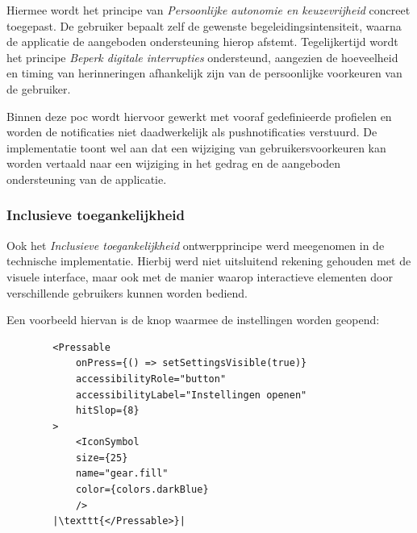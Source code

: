 \vspace{1em}

Hiermee wordt het principe van \textit{Persoonlijke autonomie en keuzevrijheid} concreet toegepast. De gebruiker bepaalt zelf de gewenste begeleidingsintensiteit, waarna de applicatie de aangeboden ondersteuning hierop afstemt. Tegelijkertijd wordt het principe \textit{Beperk digitale interrupties} ondersteund, aangezien de hoeveelheid en timing van herinneringen afhankelijk zijn van de persoonlijke voorkeuren van de gebruiker.

\vspace{1em}

Binnen deze \acrshort{poc} wordt hiervoor gewerkt met vooraf gedefinieerde profielen en worden de notificaties niet daadwerkelijk als pushnotificaties verstuurd. De implementatie toont wel aan dat een wijziging van gebruikersvoorkeuren kan worden vertaald naar een wijziging in het gedrag en de aangeboden ondersteuning van de applicatie.

\newpage

\subsubsection{Inclusieve toegankelijkheid}
\label{sec:toegankelijkheid-code}

\vspace{1em}

Ook het \textit{Inclusieve toegankelijkheid} ontwerpprincipe werd meegenomen in de technische implementatie. Hierbij werd niet uitsluitend rekening gehouden met de visuele interface, maar ook met de manier waarop interactieve elementen door verschillende gebruikers kunnen worden bediend.

\vspace{1em}

Een voorbeeld hiervan is de knop waarmee de instellingen worden geopend:

\begin{listing}[H]
    \begin{verbatim}
        <Pressable
            onPress={() => setSettingsVisible(true)}
            accessibilityRole="button"
            accessibilityLabel="Instellingen openen"
            hitSlop={8}
        >
            <IconSymbol
            size={25}
            name="gear.fill"
            color={colors.darkBlue}
            />
        |\texttt{</Pressable>}|
    \end{verbatim}
    \caption[Toegankelijke instellingenknop]
    {Toegankelijk geïmplementeerde instellingenknop met semantische rol, toegankelijkheidslabel en vergroot aanraakgebied.}
    \label{lst:accessible-settings-button}
\end{listing}

